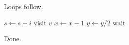 \documentclass{article}
\begin{document}
Loops follow.

\begin{algorithm}[h]
\caption{Loops}
\begin{algorithmic}[1]
\State $s \gets s + i$
\EndFor
{}
\State visit $v$
\EndFor
{}
\State $x \gets x - 1$
\EndWhile
\Repeat
\State $y \gets y / 2$
\Loop
\State wait
\EndLoop
\end{algorithmic}
\end{algorithm}

Done.
\end{document}
